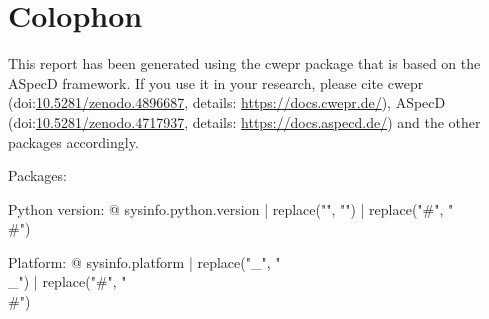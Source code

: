 \section*{Colophon}

This report has been generated using the cwepr package that is based on the ASpecD framework. If you use it in your research, please cite cwepr (doi:\href{https://doi.org/10.5281/zenodo.4896687}{10.5281/zenodo.4896687}, details: \url{https://docs.cwepr.de/}), ASpecD (doi:\href{https://doi.org/10.5281/zenodo.4717937}{10.5281/zenodo.4717937}, details: \url{https://docs.aspecd.de/}) and the other packages accordingly.

Packages: %


Python version: {@ sysinfo.python.version | replace("\n", "") | replace("#", "\\#") }

Platform: {@ sysinfo.platform | replace("_", "\\_") | replace("#", "\\#") }
